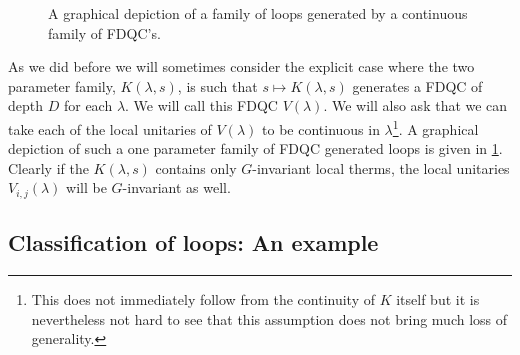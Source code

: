 \begin{figure}
	\centering
	
	\caption{A graphical depiction of a family of loops generated by a continuous family of FDQC's.}
	\label{fig:FiniteDepthQuantumCirquitLoop}
\end{figure}
As we did before we will sometimes consider the explicit case where the two parameter family, $K(\lambda,s)$, is such that $s\mapsto K(\lambda,s)$ generates a FDQC of depth $D$ for each $\lambda$. We will call this FDQC $V(\lambda)$. We will also ask that we can take each of the local unitaries of $V(\lambda)$ to be continuous in $\lambda$\footnote{This does not immediately follow from the continuity of $K$ itself but it is nevertheless not hard to see that this assumption does not bring much loss of generality.}. A graphical depiction of such a one parameter family of FDQC generated loops is given in \ref{fig:FiniteDepthQuantumCirquitLoop}. Clearly if the $K(\lambda,s)$ contains only $G$-invariant local therms, the local unitaries $V_{i,j}(\lambda)$ will be $G$-invariant as well.
\subsection{Classification of loops: An example}\label{sec:classification-of-loops-an-example}
